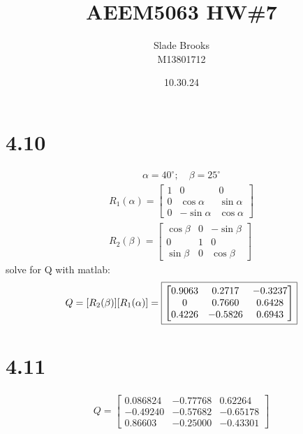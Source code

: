 \documentclass[12 pt]{article}
\title{AEEM5063 HW\#7}
\date{10.30.24}
\author{Slade Brooks \\ M13801712}
\begin{document}
\maketitle

\section*{4.10}
\begin{align*}
    \alpha=40^{\circ};\quad \beta=25^{\circ}
\end{align*}
\begin{align*}
    R_1(\alpha)=\begin{bmatrix}
        1 & 0 & 0 \\
        0 & \cos{\alpha} & \sin{\alpha} \\
        0 & -\sin{\alpha} & \cos{\alpha}
    \end{bmatrix} \\
    R_2(\beta)=\begin{bmatrix}
        \cos{\beta} & 0 & -\sin{\beta} \\
        0 & 1 & 0 \\
        \sin{\beta} & 0 & \cos{\beta}
    \end{bmatrix}
\end{align*}
solve for Q with matlab:
\begin{align*}
    Q = [R_2(\beta)][R_1(\alpha)] = \fbox{$\begin{bmatrix}
    0.9063 & 0.2717 & -0.3237 \\
    0 & 0.7660 & 0.6428 \\
    0.4226 & -0.5826 & 0.6943
    \end{bmatrix}$}
\end{align*}

\pagebreak
\section*{4.11}
\begin{align*}
    Q=\begin{bmatrix}
        0.086824 & -0.77768 & 0.62264 \\
        -0.49240 & -0.57682 & -0.65178 \\
        0.86603 & -0.25000 & -0.43301
    \end{bmatrix}
\end{align*}
\end{document}
